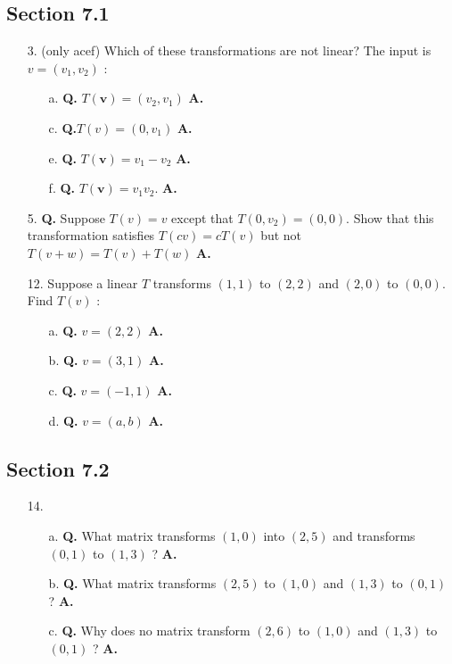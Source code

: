 \documentclass[main.tex]{subfiles}
\begin{document}
\subsection{Section 7.1}
\begin{enumerate}
    \item [3.] (only acef) Which of these transformations are not linear? The input is $v=\left(v_{1}, v_{2}\right)$ :
    \begin{enumerate}
        \item [a.] \textbf{Q.} $T(\boldsymbol{v})=\left(v_{2}, v_{1}\right)$ \textbf{A.}
        \item [c.] \textbf{Q.}$T(v)=\left(0, v_{1}\right)$ \textbf{A.}
        \item [e.] \textbf{Q.} $T(\boldsymbol{v})=v_{1}-v_{2}$ \textbf{A.}
        \item [f.] \textbf{Q.} $T(\boldsymbol{v})=v_{1} v_{2}$. \textbf{A.}
    \end{enumerate}
    
    \item [5.] \textbf{Q.} Suppose $T(v)=v$ except that $T\left(0, v_{2}\right)=(0,0)$. Show that this transformation satisfies $T(c v)=c T(v)$ but not $T(v+w)=T(v)+T(w)$ \textbf{A.}
    
    \item [12.] Suppose a linear $T$ transforms $(1,1)$ to $(2,2)$ and $(2,0)$ to $(0,0)$. Find $T(v)$ :
    \begin{enumerate}
        \item [a.] \textbf{Q.} $v=(2,2)$ \textbf{A.}
        \item [b.] \textbf{Q.} $v=(3,1)$ \textbf{A.}
        \item [c.] \textbf{Q.} $v=(-1,1)$ \textbf{A.}
        \item [d.] \textbf{Q.} $v=(a, b)$ \textbf{A.}
    \end{enumerate}
    
\end{enumerate}

\subsection{Section 7.2}
\begin{enumerate}
    \item [14.] 
    \begin{enumerate}
        \item [a.] \textbf{Q.} What matrix transforms $(1,0)$ into $(2,5)$ and transforms $(0,1)$ to $(1,3)$ ? \textbf{A.}
        \item [b.] \textbf{Q.} What matrix transforms $(2,5)$ to $(1,0)$ and $(1,3)$ to $(0,1)$ ? \textbf{A.}
        \item [c.] \textbf{Q.} Why does no matrix transform $(2,6)$ to $(1,0)$ and $(1,3)$ to $(0,1)$ ? \textbf{A.}
    \end{enumerate}
\end{enumerate}
\end{document}
